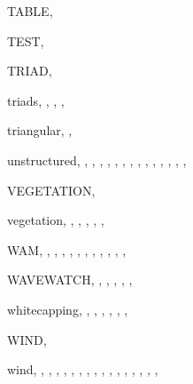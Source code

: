 \documentclass[12pt]{book}
\begin{document}
\begin{theindex}
  \indexspace

  \item TABLE, 
  \item TEST, 
  \item TRIAD, 
  \item triads, , , ,
  \item triangular, , 

  \indexspace

  \item unstructured, , ,
		, , ,
		, , ,
		, , ,
		, , ,

  \indexspace

  \item VEGETATION, 
  \item vegetation, , , ,
		, , 

  \indexspace

  \item WAM, , , ,
		, , ,
		, , ,
		, , 
  \item WAVEWATCH, , , ,
		, , 
  \item whitecapping, , , ,
		, , ,
  \item WIND, 
  \item wind, , , ,
		, , ,
		, , ,
		, , ,
		, , ,
		, 

\end{theindex}
\end{document}

